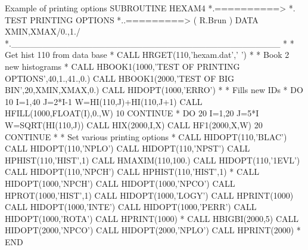 \begin{XMPt}{Example of printing options}
      SUBROUTINE HEXAM4
*.==========>
*.           TEST PRINTING OPTIONS
*..=========> ( R.Brun )
      DATA XMIN,XMAX/0.,1./
*.___________________________________________
*
*             Get hist 110 from data base
*
      CALL HRGET(110,'hexam.dat',' ')
*
*             Book 2 new histograms
*
      CALL HBOOK1(1000,'TEST OF PRINTING OPTIONS',40,1.,41.,0.)
      CALL HBOOK1(2000,'TEST OF BIG BIN',20,XMIN,XMAX,0.)
      CALL HIDOPT(1000,'ERRO')
*
*             Fills new IDs
*
      DO 10 I=1,40
         J=2*I-1
         W=HI(110,J)+HI(110,J+1)
         CALL HFILL(1000,FLOAT(I),0.,W)
  10  CONTINUE
*
      DO 20 I=1,20
         J=5*I
         W=SQRT(HI(110,J))
         CALL HIX(2000,I,X)
         CALL HF1(2000,X,W)
  20  CONTINUE
*
*             Set various printing options
*
      CALL HIDOPT(110,'BLAC')
      CALL HIDOPT(110,'NPLO')
      CALL HIDOPT(110,'NPST')
      CALL HPHIST(110,'HIST',1)
      CALL HMAXIM(110,100.)
      CALL HIDOPT(110,'1EVL')
      CALL HIDOPT(110,'NPCH')
      CALL HPHIST(110,'HIST',1)
*
      CALL HIDOPT(1000,'NPCH')
      CALL HIDOPT(1000,'NPCO')
      CALL HPROT(1000,'HIST',1)
      CALL HIDOPT(1000,'LOGY')
      CALL HPRINT(1000)
      CALL HIDOPT(1000,'INTE')
      CALL HIDOPT(1000,'PERR')
      CALL HIDOPT(1000,'ROTA')
      CALL HPRINT(1000)
*
      CALL HBIGBI(2000,5)
      CALL HIDOPT(2000,'NPCO')
      CALL HIDOPT(2000,'NPLO')
      CALL HPRINT(2000)
*
      END
\end{XMPt}
\bigskip
